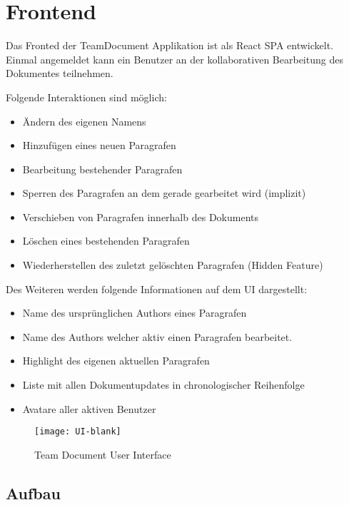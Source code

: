 \section{Frontend}

Das Fronted der TeamDocument Applikation ist als React SPA entwickelt.
Einmal angemeldet kann ein Benutzer an der kollaborativen Bearbeitung des Dokumentes teilnehmen.

Folgende Interaktionen sind möglich:

\begin{itemize}
    \item Ändern des eigenen Namens
    \item Hinzufügen eines neuen Paragrafen
    \item Bearbeitung bestehender Paragrafen
    \item Sperren des Paragrafen an dem gerade gearbeitet wird (implizit)
    \item Verschieben von Paragrafen innerhalb des Dokuments
    \item Löschen eines bestehenden Paragrafen
    \item Wiederherstellen des zuletzt gelöschten Paragrafen (Hidden Feature)
\end{itemize}

Des Weiteren werden folgende Informationen auf dem UI dargestellt:

\begin{itemize}
    \item Name des ursprünglichen Authors eines Paragrafen
    \item Name des Authors welcher aktiv einen Paragrafen bearbeitet.
    \item Highlight des eigenen aktuellen Paragrafen
    \item Liste mit allen Dokumentupdates in chronologischer Reihenfolge
    \item Avatare aller aktiven Benutzer
\end{itemize}

\begin{figure}[H]
    \texttt{[image: UI-blank]}
    \caption{Team Document User Interface}
    \label{fig:Team Document User Interface}
\end{figure}

\subsection{Aufbau}



